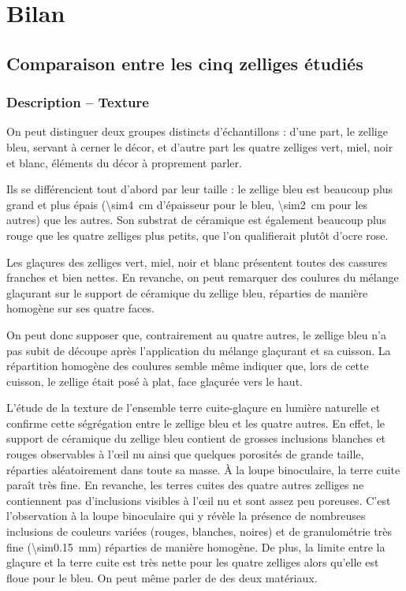 
\chapter{Bilan}

\section{Comparaison entre les cinq zelliges étudiés}

\subsection{Description -- Texture}
On peut distinguer deux groupes distincts d'échantillons : d'une part, 
le zellige bleu,  servant à cerner le décor, et d'autre 
part les quatre zelliges vert, miel, noir et blanc, éléments du décor 
à proprement parler.

Ils se différencient tout d'abord par leur taille : le zellige bleu 
est beaucoup plus grand et plus épais (\SI{\sim4}{\cm} d'épaisseur pour 
le bleu, \SI{\sim2}{\cm} pour les autres) que les autres. Son substrat 
de céramique est également beaucoup plus rouge que les quatre zelliges 
plus petits, que l'on qualifierait plutôt d'ocre rose.

Les glaçures des zelliges vert, miel, noir et blanc présentent toutes 
des cassures franches et bien nettes. En revanche, on peut remarquer 
des coulures du mélange glaçurant sur le support de céramique du zellige 
bleu, réparties de manière homogène sur ses quatre faces.

On peut donc supposer que, contrairement au quatre autres, le zellige 
bleu n'a pas subit de découpe après l'application du mélange glaçurant 
et sa cuisson. La répartition homogène des coulures semble même indiquer 
que, lors de cette cuisson, le zellige était posé à plat, face glaçurée 
vers le haut.

L'étude de la texture de l'ensemble terre cuite-glaçure en lumière 
naturelle et \CL confirme cette ségrégation entre le zellige bleu et 
les quatre autres. En effet, le support de céramique du zellige bleu 
contient de grosses inclusions blanches et rouges observables à 
l'{\oe}il nu ainsi que quelques porosités de grande taille, réparties 
aléatoirement dans toute sa masse. À la loupe binoculaire, la terre 
cuite paraît très fine. En revanche, les terres cuites des quatre 
autres zelliges ne contiennent pas d'inclusions visibles à l'{\oe}il 
nu et sont assez peu poreuses. C'est l'observation à la loupe 
binoculaire qui y révèle la présence de nombreuses inclusions de 
couleurs variées (rouges, blanches, noires) et de granulométrie 
très fine (\SI{\sim0.15}{\mm}) réparties de manière homogène. 
De plus, la limite entre la glaçure et la terre cuite est très nette 
pour les quatre  zelliges alors qu'elle est floue pour 
le bleu. On peut même parler de  des deux matériaux.

